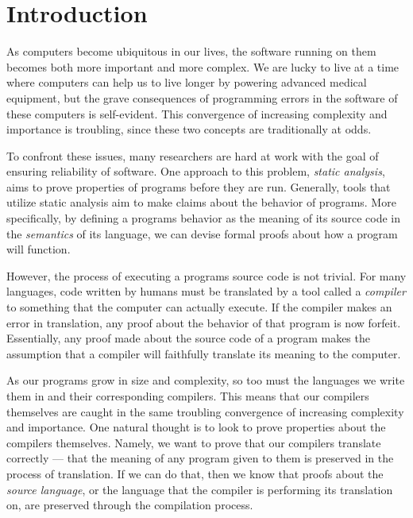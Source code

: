 \chapter{Introduction}
As computers become ubiquitous in our lives, the software running on them becomes both more important and more complex. We are lucky to live at a time where computers can help us to live longer by powering advanced medical equipment, but the grave consequences of programming errors in the software of these computers is self-evident. This convergence of increasing complexity and importance is troubling, since these two concepts are traditionally at odds. 

To confront these issues, many researchers are hard at work with the goal of ensuring reliability of software. One approach to this problem, \textit{static analysis}, aims to prove properties of programs before they are run. Generally, tools that utilize static analysis aim to make claims about the behavior of programs. More specifically, by defining a programs behavior as the meaning of its source code in the \textit{semantics} of its language, we can devise formal proofs about how a program will function.

However, the process of executing a programs source code is not trivial. For many languages, code written by humans must be translated by a tool called a \textit{compiler} to something that the computer can actually execute. If the compiler makes an error in translation, any proof about the behavior of that program is now forfeit. Essentially, any proof made about the source code of a program makes the assumption that a compiler will faithfully translate its meaning to the computer.

As our programs grow in size and complexity, so too must the languages we write them in and their corresponding compilers. This means that our compilers themselves are caught in the same troubling convergence of increasing complexity and importance. One natural thought is to look to prove properties about the compilers themselves. Namely, we want to prove that our compilers translate correctly --- that the meaning of any program given to them is preserved in the process of translation. If we can do that, then we know that proofs about the \textit{source language}, or the language that the compiler is performing its translation on, are preserved through the compilation process.

